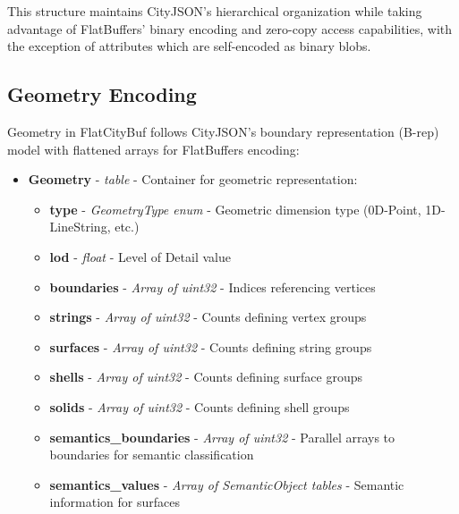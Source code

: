 This structure maintains CityJSON's hierarchical organization while taking advantage of FlatBuffers' binary encoding and zero-copy access capabilities, with the exception of attributes which are self-encoded as binary blobs.

\subsection{Geometry Encoding}
\label{methodology:feature_encoding:geometry_encoding}

Geometry in FlatCityBuf follows CityJSON's boundary representation (B-rep) model with flattened arrays for FlatBuffers encoding:

\begin{itemize}
  \item \textbf{Geometry} - \textit{table} - Container for geometric representation:
    \begin{itemize}
      \item \textbf{type} - \textit{GeometryType enum} - Geometric dimension type (0D-Point, 1D-LineString, etc.)
      \item \textbf{lod} - \textit{float} - Level of Detail value
      \item \textbf{boundaries} - \textit{Array of uint32} - Indices referencing vertices
      \item \textbf{strings} - \textit{Array of uint32} - Counts defining vertex groups
      \item \textbf{surfaces} - \textit{Array of uint32} - Counts defining string groups
      \item \textbf{shells} - \textit{Array of uint32} - Counts defining surface groups
      \item \textbf{solids} - \textit{Array of uint32} - Counts defining shell groups
      \item \textbf{semantics\_boundaries} - \textit{Array of uint32} - Parallel arrays to boundaries for semantic classification
      \item \textbf{semantics\_values} - \textit{Array of SemanticObject tables} - Semantic information for surfaces
    \end{itemize}


\end{itemize}
